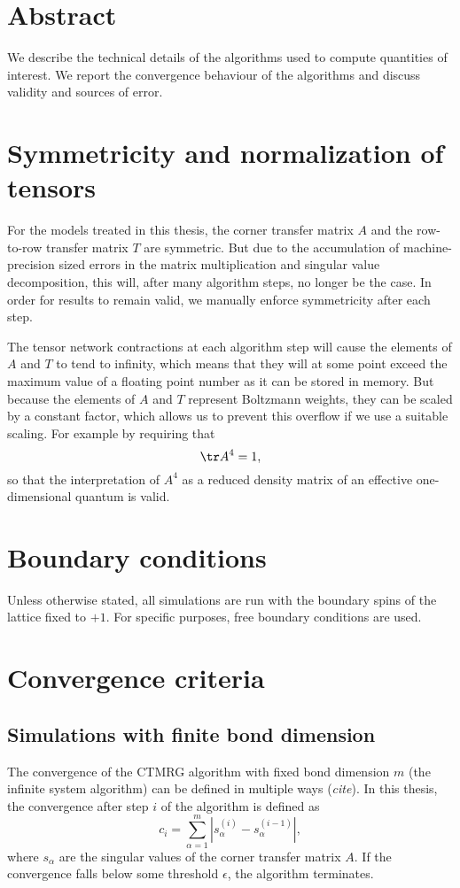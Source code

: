 \section{Abstract}

We describe the technical details of the algorithms used to compute quantities of interest.
We report the convergence behaviour of the algorithms and discuss validity and sources of error.

\section{Symmetricity and normalization of tensors}
For the models treated in this thesis, the corner transfer matrix $A$ and the row-to-row transfer matrix $T$ are
symmetric. But due to the accumulation of machine-precision sized errors in the matrix multiplication and singular value
decomposition, this will, after many algorithm steps, no longer be the case. In order for results to remain valid, we
manually enforce symmetricity after each step.

The tensor network contractions at each algorithm step will cause the elements of $A$ and $T$ to tend to infinity, which
means that they will at some point exceed the maximum value of a floating point number as it can be stored in memory.
But because the elements of $A$ and $T$ represent Boltzmann weights, they can be scaled by a constant factor, which
allows us to prevent this overflow if we use a suitable scaling. For example by requiring that
\begin{equation}
  \tr A^4 = 1,
\end{equation}
so that the interpretation of $A^4$ as a reduced density matrix of an effective one-dimensional quantum is valid.

\section{Boundary conditions}
Unless otherwise stated, all simulations are run with the boundary spins of the lattice fixed to $+1$.
For specific purposes, free boundary conditions are used.

\section{Convergence criteria}

\subsection{Simulations with finite bond dimension}
The convergence of the CTMRG algorithm with fixed bond dimension $m$ (the infinite system algorithm) can be defined
in multiple ways (\emph{cite}). In this thesis, the convergence after step $i$ of the algorithm is defined as
\begin{equation}\label{eq:convergence}
  c_i = \sum_{\alpha = 1}^{m} | s_{\alpha}^{(i)} - s_{\alpha}^{(i - 1)} |,
\end{equation}
where $s_{\alpha}$ are the singular values of the corner transfer matrix $A$. If the convergence falls below some
threshold $\epsilon$, the algorithm terminates.

